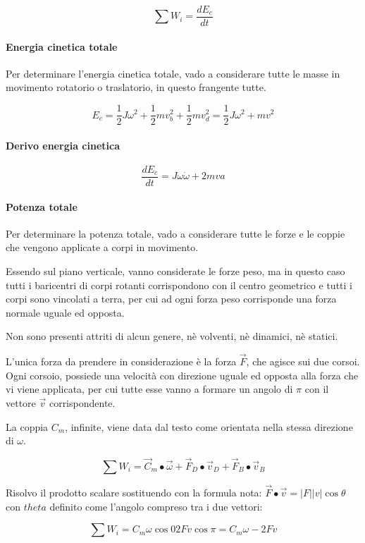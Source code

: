 \documentclass[main.tex]{subfiles}
\begin{document}
\[
	\sum W_i = \dfrac{dE_c}{dt}
\]

\paragraph{Energia cinetica totale} Per determinare l'energia cinetica totale, vado a considerare tutte le masse in movimento rotatorio o traslatorio, in questo frangente tutte.

\[
	E_c = \dfrac{1}{2}J\omega^2 + \dfrac{1}{2}mv_b^2 + \dfrac{1}{2}mv_d^2 = \dfrac{1}{2}J\omega^2 + mv^2
\]

\paragraph{Derivo energia cinetica}

\[
	\dfrac{dE_c}{dt} = J\omega\dot{\omega} + 2mva
\]

\paragraph{Potenza totale} Per determinare la potenza totale, vado a considerare tutte le forze e le coppie che vengono applicate a corpi in movimento.

Essendo sul piano verticale, vanno considerate le forze peso, ma in questo caso tutti i baricentri di corpi rotanti corrispondono con il centro geometrico e tutti i corpi sono vincolati a terra, per cui ad ogni forza peso corrisponde una forza normale uguale ed opposta.

Non sono presenti attriti di alcun genere, nè volventi, nè dinamici, nè statici.

L'unica forza da prendere in considerazione è la forza $\vec{F}$, che agisce sui due corsoi. Ogni corsoio, possiede una velocità con direzione uguale ed opposta alla forza che vi viene applicata, per cui tutte esse vanno a formare un angolo di $\pi$ con il vettore $\vec{v}$ corrispondente.

La coppia $C_m$, infinite, viene data dal testo come orientata nella stessa direzione di $\omega$.

\[
	\sum W_i =  \vec{C}_m\bullet\vec{\omega} + \vec{F}_D\bullet\vec{v}_D +  \vec{F}_B\bullet\vec{v}_B
\]

Risolvo il prodotto scalare sostituendo con la formula nota: $\vec{F}\bullet\vec{v} = |F||v|\cos\theta$ con $theta$ definito come l'angolo compreso tra i due vettori:

\[
	\sum W_i = C_m\omega\cos0 2Fv\cos\pi = C_m\omega-2Fv
\]
\end{document}
